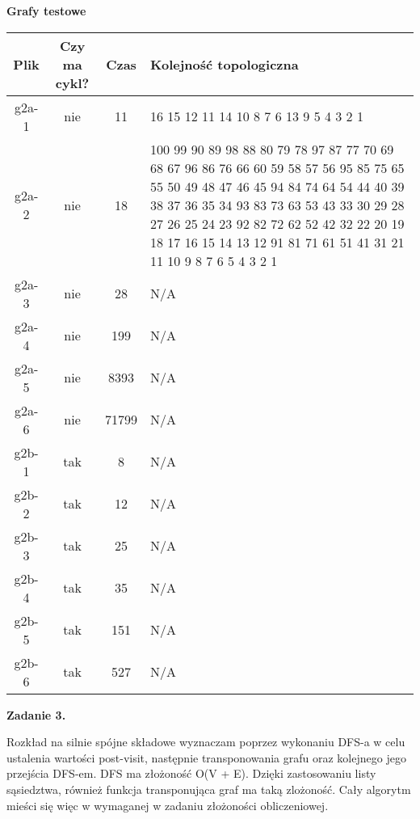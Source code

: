 \documentclass[15pt, a4paper]{article}
\begin{document}
\begin{center}
    \textbf{Grafy testowe}
\end{center}

\begin{table}[ht]
    \begin{tabular}{|c|c|c|p{10cm}|}
        \hline
        Plik & Czy ma cykl? & Czas & Kolejność topologiczna \\ \hline
        g2a-1 & nie & 11 & 16 15 12 11 14 10 8 7 6 13 9 5 4 3 2 1 \\ \hline
        g2a-2 & nie & 18 & 100 99 90 89 98 88 80 79 78 97 87 77 70 69 68 67 96 86 76 66 60 59 58 57 56 95 85 75 65 55 50 49 48 47 46 45 94 84 74 64 54 44 40 39 38 37 36 35 34 93 83 73 63 53 43 33 30 29 28 27 26 25 24 23 92 82 72 62 52 42 32 22 20 19 18 17 16 15 14 13 12 91 81 71 61 51 41 31 21 11 10 9 8 7 6 5 4 3 2 1 \\ \hline
        g2a-3 & nie & 28 & N/A \\ \hline
        g2a-4 & nie & 199 & N/A \\ \hline
        g2a-5 & nie & 8393 & N/A \\ \hline
        g2a-6 & nie & 71799 & N/A \\ \hline
        g2b-1 & tak & 8 & N/A \\ \hline
        g2b-2 & tak & 12 & N/A \\ \hline
        g2b-3 & tak & 25 & N/A \\ \hline
        g2b-4 & tak & 35 & N/A \\ \hline
        g2b-5 & tak & 151 & N/A \\ \hline
        g2b-6 & tak & 527 & N/A \\ \hline
    \end{tabular}
    \label{tab:grafy testowe 1}
\end{table}


\vspace{0.5cm}

\noindent\hrulefill

\vspace{0.5cm}

\noindent\textbf{Zadanie 3.} 

\noindent Rozkład na silnie spójne składowe wyznaczam poprzez wykonaniu DFS-a w celu ustalenia wartości post-visit, następnie transponowania grafu oraz kolejnego jego przejścia DFS-em. DFS ma złożoność O(V + E). Dzięki zastosowaniu listy sąsiedztwa, również funkcja transponująca graf ma taką zlożoność. Cały algorytm mieści się więc w wymaganej w zadaniu złożoności obliczeniowej.
\end{document}

